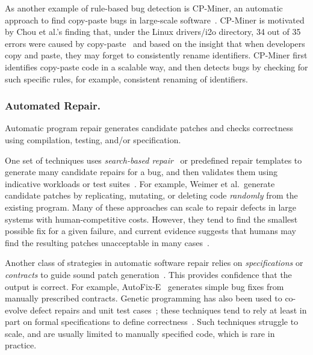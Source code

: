 As another example of rule-based bug detection is CP-Miner, an automatic approach to find copy-paste bugs in large-scale software~\cite{Li2006:CPMiner}. CP-Miner is motivated by Chou et al.'s finding that, under the Linux {\sf drivers/i2o} directory, 34 out of 35 errors were caused by copy-paste~\cite{Chou2001:ESO} and based on the insight that when developers copy and paste, they may forget to consistently rename identifiers. CP-Miner first identifies copy-paste code in a scalable way, and then detects bugs by checking for such specific rules, for example, consistent renaming of identifiers. %
\subsubsection{Automated Repair.} 
Automatic program repair generates candidate patches and checks correctness using compilation, testing, and/or specification. 

One set of techniques uses {\em search-based repair}~\cite{harman07} or predefined repair templates to generate many candidate repairs for a bug, and then validates them using indicative workloads or test suites~\cite{Kim2013:PAR, genprog-icse2012, Perkins09:clearview}. For example, Weimer et al.~generate candidate patches by replicating, mutating, or deleting code \emph{randomly} from the existing program. Many of these approaches can scale to repair defects in large systems with human-competitive costs. However, they tend to find the smallest possible fix for a given failure, and current evidence suggests that humans may find the resulting patches unacceptable in many cases~\cite{genprog-maintainability,Kim2013:PAR}. 

Another class of strategies in automatic software repair relies on {\em specifications} or {\em contracts} to guide sound patch generation~\cite{gopinath2011, liblit2011, liu2012, semfix13,Wei:2010:AutoFix-E}. This provides confidence that the output is correct. For example, AutoFix-E~\cite{Wei:2010:AutoFix-E} generates simple bug fixes from manually prescribed contracts. Genetic programming has also been used to co-evolve defect repairs and unit test cases~\cite{Arcuri11,wilkerson2012}; these techniques tend to rely at least in part on formal specifications to define correctness~\cite{arcuriy08,wilkerson11}.  Such techniques struggle to scale, and are usually limited to manually specified code, which is rare in practice.

